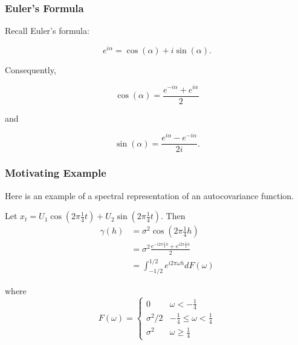 \documentclass[%
xcolor=pdftex]{beamer}
\begin{document}
\begin{frame}
\frametitle{Euler's Formula}

Recall Euler's formula:

\begin{equation} \label{eq:euler}
e^{i \alpha} = \cos (\alpha) + i \sin (\alpha).
\end{equation}

Consequently,

\begin{equation} \label{eq:ecos}
\cos(\alpha) = \frac{e^{-i \alpha} + e^{i \alpha}}{2}
\end{equation}

and

\begin{equation} \label{eq:esin}
\sin(\alpha) = \frac{e^{i \alpha} - e^{-i \alpha}}{2i}.
\end{equation}

\end{frame}


% 
% 
% 
% 


\begin{frame}
\frametitle{Motivating Example}

Here is an example of a spectral representation of an autocovariance function.
\newline

Let $x_t = U_1 \cos(2\pi \frac{1}{4} t) + U_2 \sin(2 \pi \frac{1}{4} t)$.  Then
\begin{align*}
\gamma(h) &= \sigma^2 \cos (2 \pi \frac{1}{4} h) \\
&= \sigma^2 \frac{ e^{-i 2 \pi \frac{1}{4} h } + e^{i 2 \pi \frac{1}{4} h } }{2} \\
&= \int_{-1/2}^{1/2} e^{ i 2 \pi \omega h} d F(\omega)
\end{align*}

where 
$$
F(\omega) = 
\begin{cases}
0 & \omega < - \frac{1}{4}\\ 
\sigma^2/2 & - \frac{1}{4} \le \omega < \frac{1}{4}\\
\sigma^2 & \omega \ge \frac{1}{4}
\end{cases}
$$

\end{frame}
\end{document}
